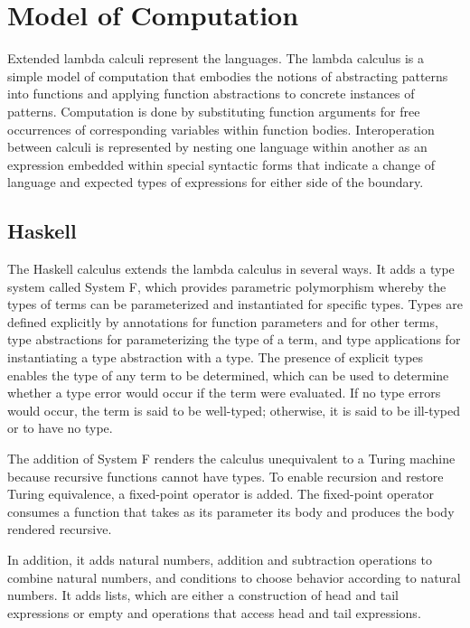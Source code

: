 \chapter{Model of Computation}

Extended lambda calculi represent the languages.  The lambda calculus is a simple model of computation that embodies the notions of abstracting patterns into functions and applying function abstractions to concrete instances of patterns.  Computation is done by substituting function arguments for free occurrences of corresponding variables within function bodies.  Interoperation between calculi is represented by nesting one language within another as an expression embedded within special syntactic forms that indicate a change of language and expected types of expressions for either side of the boundary.

\section{Haskell}

The Haskell calculus extends the lambda calculus in several ways.  It adds a type system called System F, which provides parametric polymorphism whereby the types of terms can be parameterized and instantiated for specific types.  Types are defined explicitly by annotations for function parameters and for other terms, type abstractions for parameterizing the type of a term, and type applications for instantiating a type abstraction with a type.  The presence of explicit types enables the type of any term to be determined, which can be used to determine whether a type error would occur if the term were evaluated.  If no type errors would occur, the term is said to be well-typed; otherwise, it is said to be ill-typed or to have no type.

The addition of System F renders the calculus unequivalent to a Turing machine because recursive functions cannot have types.  To enable recursion and restore Turing equivalence, a fixed-point operator is added.  The fixed-point operator consumes a function that takes as its parameter its body and produces the body rendered recursive.

In addition, it adds natural numbers, addition and subtraction operations to combine natural numbers, and conditions to choose behavior according to natural numbers.  It adds lists, which are either a construction of head and tail expressions or empty and operations that access head and tail expressions.

